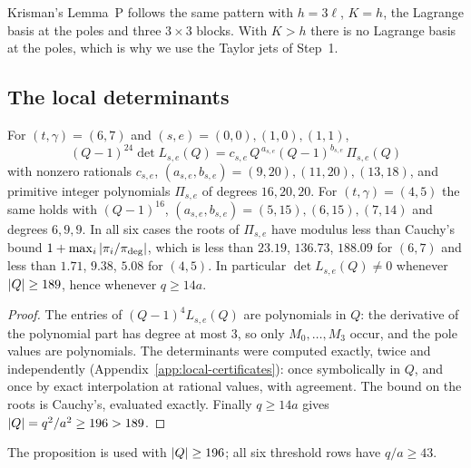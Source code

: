 Krisman's Lemma~P \cite[Thm.~8.1]{Krisman2026chi2} follows the same pattern with $h=3\ell$,
$K=h$, the Lagrange basis at the poles and three $3\times3$ blocks. With $K>h$ there is no
Lagrange basis at the poles, which is why we use the Taylor jets of Step~1.

\subsection{The local determinants}\label{subsec:local-dets}

\begin{proposition}\label{prop:local-dets}
For $(t,\gamma)=(6,7)$ and $(s,e)=(0,0),(1,0),(1,1)$,
\[
  (Q-1)^{24}\det L_{s,e}(Q)=c_{s,e}\,Q^{\,a_{s,e}}(Q-1)^{b_{s,e}}\,\Pi_{s,e}(Q)
\]
with nonzero rationals $c_{s,e}$, $(a_{s,e},b_{s,e})=(9,20),(11,20),(13,18)$, and primitive
integer polynomials $\Pi_{s,e}$ of degrees $16,20,20$. For $(t,\gamma)=(4,5)$ the same holds with
$(Q-1)^{16}$, $(a_{s,e},b_{s,e})=(5,15),(6,15),(7,14)$ and degrees $6,9,9$. In all six cases the
roots of $\Pi_{s,e}$ have modulus less than Cauchy's bound $1+\max_i\left\lvert \pi_i/\pi_{\deg}\right\rvert$, which is less than
$23.19$, $136.73$, $188.09$ for $(6,7)$ and less than $1.71$, $9.38$, $5.08$ for $(4,5)$. In
particular $\det L_{s,e}(Q)\ne0$ whenever $\left\lvert Q\right\rvert\ge189$, hence whenever $q\ge14a$.
\end{proposition}

\begin{proof}
The entries of $(Q-1)^4L_{s,e}(Q)$ are polynomials in $Q$: the derivative of the polynomial part has
degree at most $3$, so only $M_0,\dots,M_3$ occur, and the pole values are polynomials. The
determinants were computed exactly, twice and independently (Appendix~\ref{app:local-certificates}): once
symbolically in $Q$, and once by exact interpolation at rational values, with agreement. The bound on
the roots is Cauchy's, evaluated exactly. Finally $q\ge14a$ gives $\left\lvert Q\right\rvert=q^2/a^2\ge196>189$.
\end{proof}

The proposition is used with $\left\lvert Q\right\rvert\ge196$; all six threshold rows have $q/a\ge43$.
